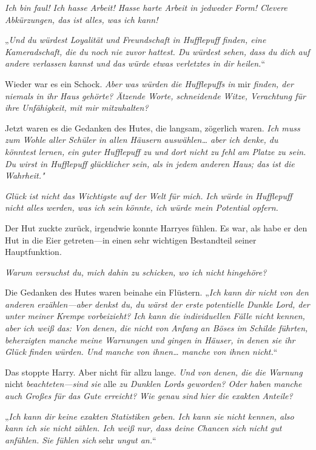 {\emph{Ich bin faul! Ich hasse Arbeit! Hasse harte Arbeit in jedweder Form! Clevere Abkürzungen, das ist alles, was ich kann!}

„\emph{Und du würdest Loyalität und Freundschaft in Hufflepuff finden, eine Kameradschaft, die du noch nie zuvor hattest. Du würdest sehen, dass du dich auf andere verlassen kannst und das würde etwas verletztes in dir heilen.}“

Wieder war es ein Schock. \emph{Aber was würden die Hufflepuffs in} mir \emph{finden, der niemals in ihr Haus gehörte? Ätzende Worte, schneidende Witze, Verachtung für ihre Unfähigkeit, mit mir mitzuhalten?}

Jetzt waren es die Gedanken des Hutes, die langsam, zögerlich waren. \emph{Ich muss zum Wohle aller Schüler in allen Häusern auswählen… aber ich denke, du könntest lernen, ein guter Hufflepuff zu und dort nicht zu fehl am Platze zu sein. Du wirst in Hufflepuff glücklicher sein, als in jedem anderen Haus; das ist die Wahrheit."}

\emph{Glück ist nicht das Wichtigste auf der Welt für mich. Ich würde in Hufflepuff nicht alles werden, was ich sein könnte, ich würde mein Potential opfern.}

Der Hut zuckte zurück, irgendwie konnte Harryes fühlen. Es war, als habe er den Hut in die Eier getreten—in einen sehr wichtigen Bestandteil seiner Hauptfunktion.

\emph{Warum versuchst du, mich dahin zu schicken, wo ich nicht hingehöre?}

Die Gedanken des Hutes waren beinahe ein Flüstern. „\emph{Ich kann dir nicht von den anderen erzählen—aber denkst du, du wärst der erste potentielle Dunkle Lord, der unter meiner Krempe vorbeizieht? Ich kann die individuellen Fälle nicht kennen, aber ich weiß das: Von denen, die nicht von Anfang an Böses im Schilde führten, beherzigten manche meine Warnungen und gingen in Häuser, in denen sie ihr Glück finden würden. Und manche von ihnen… manche von ihnen nicht.}“

Das stoppte Harry. Aber nicht für allzu lange. \emph{Und von denen, die die Warnung} nicht \emph{beachteten—sind sie} alle \emph{zu Dunklen Lords geworden? Oder haben manche auch Großes für das Gute erreicht? Wie genau sind hier die exakten Anteile?}

„\emph{Ich kann dir keine exakten Statistiken geben. Ich kann sie nicht kennen, also kann ich sie nicht zählen. Ich weiß nur, dass deine Chancen sich nicht gut anfühlen. Sie fühlen sich} sehr \emph{ungut an.}“

}
